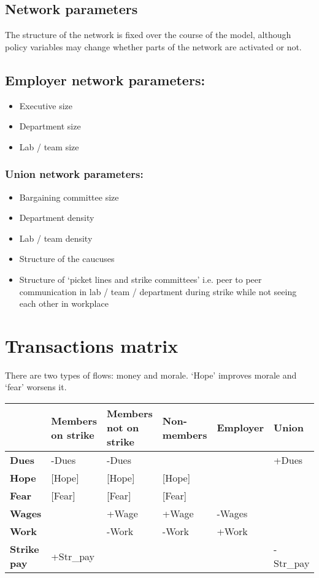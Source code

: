 \documentclass[a4paper]{article}
\begin{document}
\subsection{Network parameters}

The structure of the network is fixed over the course of the model, although policy variables may change whether parts of the network are activated or not. 

\subsection{Employer network parameters:}
\begin{itemize}
    \item Executive size
    \item Department size
    \item Lab / team size
\end{itemize}

\subsubsection{Union network parameters:}

\begin{itemize}
    \item Bargaining committee size
    \item Department density
    \item Lab / team density
    \item Structure of the caucuses
    \item Structure of ‘picket lines and strike committees’ i.e. peer to peer communication in lab / team / department during strike while not seeing each other in workplace
\end{itemize}

\section{Transactions matrix}

There are two types of flows: money and morale. ‘Hope’ improves morale and ‘fear’ worsens it.

\begin{tabular}{| l | l | l | l | l | l | }
\hline
  & \textbf{Members on strike} & \textbf{Members not on strike} & \textbf{Non-members} & \textbf{Employer} & \textbf{Union} \\
\hline
\textbf{Dues} & -Dues & -Dues &   &   & +Dues \\
\hline
\textbf{Hope} & [Hope] & [Hope]

  & [Hope] &   &  \\
\hline
\textbf{Fear} & [Fear] & [Fear] & [Fear] &   & \\
\hline
\textbf{Wages} &   & +Wage & +Wage & -Wages & \\
\hline
\textbf{Work} &   & -Work & -Work & +Work & \\
\hline
\textbf{Strike pay} & +Str\_pay &   &   &   & -Str\_pay \\
\hline
\end{tabular}
\end{document}
